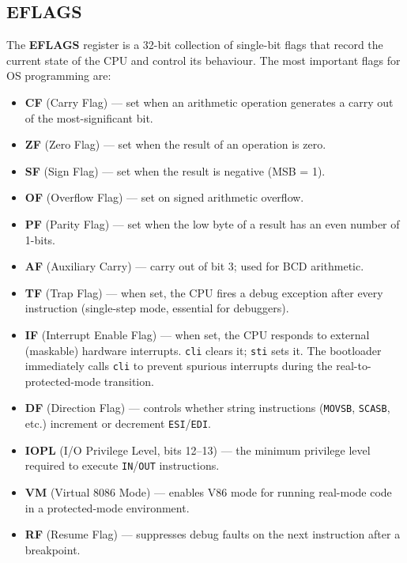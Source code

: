 \documentclass[11pt]{article}
\begin{document}
\subsection{EFLAGS}

The \textbf{EFLAGS} register is a 32-bit collection of single-bit flags that record the
current state of the CPU and control its behaviour. The most important flags for OS
programming are:

\begin{itemize}
    \item \textbf{CF} (Carry Flag) --- set when an arithmetic operation generates a carry
          out of the most-significant bit.
    \item \textbf{ZF} (Zero Flag) --- set when the result of an operation is zero.
    \item \textbf{SF} (Sign Flag) --- set when the result is negative (MSB = 1).
    \item \textbf{OF} (Overflow Flag) --- set on signed arithmetic overflow.
    \item \textbf{PF} (Parity Flag) --- set when the low byte of a result has an even
          number of 1-bits.
    \item \textbf{AF} (Auxiliary Carry) --- carry out of bit 3; used for BCD arithmetic.
    \item \textbf{TF} (Trap Flag) --- when set, the CPU fires a debug exception after
          every instruction (single-step mode, essential for debuggers).
    \item \textbf{IF} (Interrupt Enable Flag) --- when set, the CPU responds to external
          (maskable) hardware interrupts. \texttt{cli} clears it; \texttt{sti} sets it.
          The bootloader immediately calls \texttt{cli} to prevent spurious interrupts
          during the real-to-protected-mode transition.
    \item \textbf{DF} (Direction Flag) --- controls whether string instructions
          (\texttt{MOVSB}, \texttt{SCASB}, etc.) increment or decrement \texttt{ESI}/\texttt{EDI}.
    \item \textbf{IOPL} (I/O Privilege Level, bits 12--13) --- the minimum privilege level
          required to execute \texttt{IN}/\texttt{OUT} instructions.
    \item \textbf{VM} (Virtual 8086 Mode) --- enables V86 mode for running real-mode code
          in a protected-mode environment.
    \item \textbf{RF} (Resume Flag) --- suppresses debug faults on the next instruction
          after a breakpoint.
\end{itemize}
\end{document}
